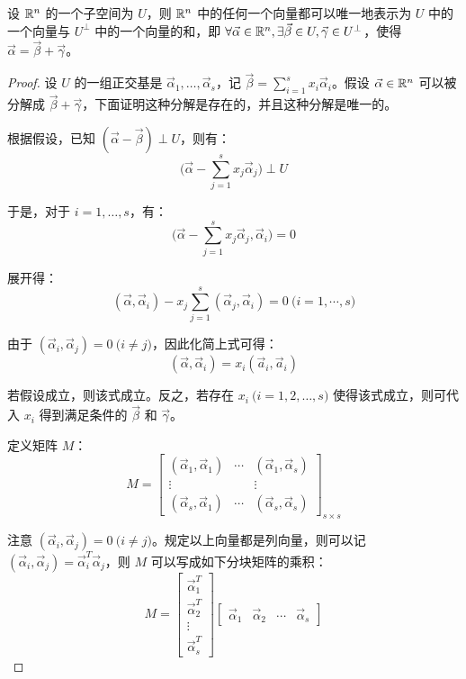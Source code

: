 \begin{theorem}
	设 $\mathbb R^n$ 的一个子空间为 $U$，则 $\mathbb R^n$ 中的任何一个向量都可以唯一地表示为 $U$ 中的一个向量与 $U^\perp$ 中的一个向量的和，即 $\forall \vec \alpha \in \mathbb R^n, \exists \vec \beta \in U, \vec \gamma \in U^\perp$，使得 $\vec \alpha = \vec \beta + \vec \gamma$。
\end{theorem}

\begin{proof}
	设 $U$ 的一组正交基是 $\vec \alpha_1, \ldots, \vec \alpha_s$，记 $\vec \beta = \sum\limits_{i = 1}^{s} x_i \vec \alpha_i$。假设 $\vec \alpha \in \mathbb R^n$ 可以被分解成 $\vec \beta + \vec \gamma$，下面证明这种分解是存在的，并且这种分解是唯一的。

	根据假设，已知 $(\vec \alpha - \vec \beta) \perp U$，则有：
	$$
	\biggl( \vec \alpha - \sum\limits_{j = 1}^s x_j \vec \alpha_j \biggr) \perp U
	$$

	于是，对于 $i = 1, \ldots, s$，有：
	$$
	\biggl( \vec \alpha - \sum\limits_{j = 1}^s x_j \vec \alpha_j, \vec \alpha_i \biggr) = 0
	$$

	展开得：
	$$
	(\vec \alpha, \vec \alpha_i) - x_j \sum\limits_{j = 1}^s (\vec \alpha_j, \vec \alpha_i) = 0 \pod{i = 1, \cdots, s}
	$$

	由于 $(\vec \alpha_i, \vec \alpha_j) = 0 \pod{i \ne j}$，因此化简上式可得：
	$$
	(\vec \alpha, \vec \alpha_i) = x_i (\vec a_i, \vec a_i)
	$$

	若假设成立，则该式成立。反之，若存在 $x_i \pod{i = 1, 2, \ldots, s}$ 使得该式成立，则可代入 $x_i$ 得到满足条件的 $\vec \beta$ 和 $\vec \gamma$。

	\bigskip

	定义矩阵 $M$：
	$$
	M =
	\begin{bmatrix}
	(\vec \alpha_1, \vec \alpha_1) & \cdots & (\vec \alpha_1, \vec \alpha_s)
	\\
	\vdots && \vdots
	\\
	(\vec \alpha_s, \vec \alpha_1) & \cdots & (\vec \alpha_s, \vec \alpha_s)
	\end{bmatrix}_{s \times s}
	$$

	注意 $(\vec \alpha_i, \vec \alpha_j) = 0 \pod{i \ne j}$。规定以上向量都是列向量，则可以记 $(\vec \alpha_i ,\vec \alpha_j) = \vec \alpha_i^T \vec \alpha_j$，则 $M$ 可以写成如下分块矩阵的乘积：
	$$
	M =
	\begin{bmatrix} \vec \alpha_1^T \\ \vec \alpha_2^T \\ \vdots \\ \vec \alpha_s^T \end{bmatrix}
	\begin{bmatrix} \vec \alpha_1 & \vec \alpha_2 & \cdots & \vec \alpha_s \end{bmatrix}
	$$


\end{proof}
